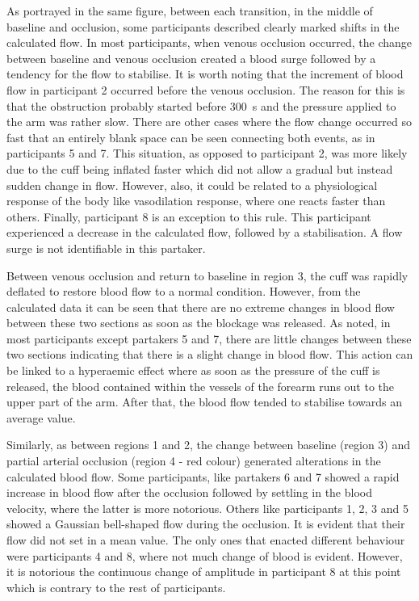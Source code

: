 As portrayed in the same figure, between each transition, in the middle of baseline and occlusion, some participants described clearly marked shifts in the calculated flow. In most participants, when venous occlusion occurred, the change between baseline and venous occlusion created a blood surge followed by a tendency for the flow to stabilise. It is worth noting that the increment of blood flow in participant 2 occurred before the venous occlusion. The reason for this is that the obstruction probably started before \SI{300}{\second} and the pressure applied to the arm was rather slow. There are other cases where the flow change occurred so fast that an entirely blank space can be seen connecting both events, as in participants 5 and 7. This situation, as opposed to participant 2, was more likely due to the cuff being inflated faster which did not allow a gradual but instead sudden change in flow. However, also, it could be related to a physiological response of the body like vasodilation response, where one reacts faster than others. Finally, participant 8 is an exception to this rule. This participant experienced a decrease in the calculated flow, followed by a stabilisation. A flow surge is not identifiable in this partaker.

Between venous occlusion and return to baseline in region 3, the cuff was rapidly deflated to restore blood flow to a normal condition. However, from the calculated data it can be seen that there are no extreme changes in blood flow between these two sections as soon as the blockage was released. As noted, in most participants except partakers 5 and 7, there are little changes between these two sections indicating that there is a slight change in blood flow. This action can be linked to a hyperaemic effect where as soon as the pressure of the cuff is released, the blood contained within the vessels of the forearm runs out to the upper part of the arm. After that, the blood flow tended to stabilise towards an average value.

Similarly, as between regions 1 and 2, the change between baseline (region 3) and partial arterial occlusion (region 4 - red colour) generated alterations in the calculated blood flow. Some participants, like partakers 6 and 7 showed a rapid increase in blood flow after the occlusion followed by settling in the blood velocity, where the latter is more notorious. Others like participants 1, 2, 3 and 5 showed a Gaussian bell-shaped flow during the occlusion. It is evident that their flow did not set in a mean value. The only ones that enacted different behaviour were participants 4 and 8, where not much change of blood is evident. However, it is notorious the continuous change of amplitude in participant 8 at this point which is contrary to the rest of participants.


